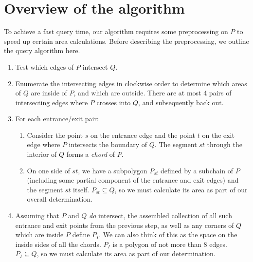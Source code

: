 \section{Overview of the algorithm}
\label{:convexp:approach}

To achieve a fast query time, our algorithm requires some preprocessing on $P$ to speed up certain area calculations. Before describing the preprocessing, we outline the query algorithm here.

\begin{enumerate}
 \item Test which edges of $P$ intersect $Q$.
 
 \item Enumerate the intersecting edges in clockwise order to determine which areas of $Q$ are inside of $P$, and which are outside. There are at most 4 pairs of intersecting edges where $P$ crosses into $Q$, and subsequently back out.
 
 \item For each entrance/exit pair:
 \begin{enumerate}
  \item Consider the point $s$ on the entrance edge and the point $t$ on the exit edge where $P$ intersects the boundary of $Q$. The segment $st$  through the interior of $Q$ forms a \emph{chord} of $P$.
  
  \item On one side of $st$, we have a subpolygon $P_{st}$ defined by a subchain of $P$ (including some partial component of the entrance and exit edges) and the segment $st$ itself. $P_{st} \subseteq Q$, so we must calculate its area as part of our overall determination.
  
 \end{enumerate}

 \item Assuming that $P$ and $Q$ \emph{do} intersect, the assembled collection of all such entrance and exit points from the previous step, as well as any corners of $Q$ which are inside $P$ define $P_I$. We can also think of this as the space on the inside sides of all the chords. $P_I$ is a polygon of not more than 8 edges. $P_I \subseteq Q$, so we must calculate its area as part of our determination.
 
\end{enumerate}


